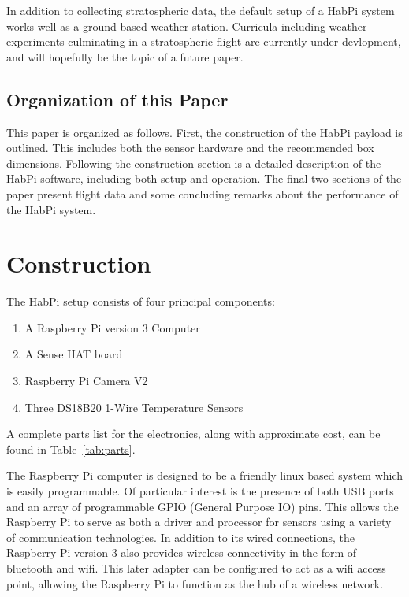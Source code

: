 \documentclass[journal]{new-aiaa}
\begin{document}
In addition to collecting stratospheric data, the default setup of
a HabPi system works well as a ground based weather station.
Curricula including weather experiments culminating in a stratospheric
flight are currently under devlopment, and will hopefully be the topic
of a future paper.

\subsection{Organization of this Paper}
This paper is organized as follows.  First, the construction of the
HabPi payload is outlined.  This includes both the sensor hardware and
the recommended box dimensions.  Following the construction section is
a detailed description of the HabPi software, including both setup and
operation.  The final two sections of the paper present flight data
and some concluding remarks about the performance of the HabPi system. 

\section{Construction}
The HabPi setup consists of four principal components:
\begin{enumerate}
    \item A Raspberry Pi version 3 Computer~\cite{RaspberryPi}
    \item A Sense HAT board~\cite{SenseHat}
    \item Raspberry Pi Camera V2~\cite{RaspberryPi}
    \item Three DS18B20 1-Wire Temperature Sensors~\cite{DS18B20}
\end{enumerate}
A complete parts list for the electronics, along with approximate
cost, can be found in Table~\ref{tab:parts}.

The Raspberry Pi computer is designed to be a friendly linux based
system which is easily programmable.  Of particular interest is the
presence of both USB ports and an array of programmable GPIO (General
Purpose IO) pins.  This allows the Raspberry Pi to serve as both
a driver and processor for sensors using a variety of communication
technologies.  In addition to its wired connections, the Raspberry Pi
version 3 also provides wireless connectivity in the form of bluetooth
and wifi.  This later adapter can be configured to act as a wifi
access point, allowing the Raspberry Pi to function as the hub of
a wireless network.
\end{document}
